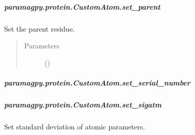 \documentclass[a4paper,10pt,english]{sphinxmanual}
\begin{document}
\begin{fulllineitems}
\begin{fulllineitems}
\subparagraph{paramagpy.protein.CustomAtom.set\_parent}
\label{\detokenize{reference/generated/paramagpy.protein.CustomAtom.set_parent:paramagpy-protein-customatom-set-parent}}\label{\detokenize{reference/generated/paramagpy.protein.CustomAtom.set_parent::doc}}

\begin{fulllineitems}
\label{\detokenize{reference/generated/paramagpy.protein.CustomAtom.set_parent:paramagpy.protein.CustomAtom.set_parent}}
Set the parent residue.
\begin{quote}\begin{description}
\item[{Parameters}] \leavevmode
{} (\sphinxstyleliteralemphasis{\sphinxupquote{-}}) \textendash{} 

\end{description}\end{quote}

\end{fulllineitems}



\subparagraph{paramagpy.protein.CustomAtom.set\_serial\_number}
\label{\detokenize{reference/generated/paramagpy.protein.CustomAtom.set_serial_number:paramagpy-protein-customatom-set-serial-number}}\label{\detokenize{reference/generated/paramagpy.protein.CustomAtom.set_serial_number::doc}}

\begin{fulllineitems}
\label{\detokenize{reference/generated/paramagpy.protein.CustomAtom.set_serial_number:paramagpy.protein.CustomAtom.set_serial_number}}
\end{fulllineitems}



\subparagraph{paramagpy.protein.CustomAtom.set\_sigatm}
\label{\detokenize{reference/generated/paramagpy.protein.CustomAtom.set_sigatm:paramagpy-protein-customatom-set-sigatm}}\label{\detokenize{reference/generated/paramagpy.protein.CustomAtom.set_sigatm::doc}}

\begin{fulllineitems}
\label{\detokenize{reference/generated/paramagpy.protein.CustomAtom.set_sigatm:paramagpy.protein.CustomAtom.set_sigatm}}
Set standard deviation of atomic parameters.


\end{fulllineitems}
\end{fulllineitems}
\end{fulllineitems}
\end{document}
